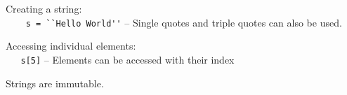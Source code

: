 Creating a string:\\
{\ex \lstinline|    s = ``Hello World''|} -- Single quotes and triple
quotes can also be used.  

Accessing individual elements:\\
{\ex \lstinline|   s[5]|} -- Elements can be accessed with their index

Strings are immutable. 
